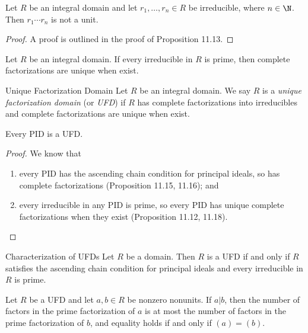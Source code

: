 \documentclass[pmath347]{subfiles}
\begin{document}
    \begin{prop}{}
        Let $R$ be an integral domain and let $r_1,\ldots,r_n\in R$ be irreducible, where $n\in\N$. Then $r_1\cdots r_n$ is not a unit.
    \end{prop}

    \begin{proof}
        A proof is outlined in the proof of Proposition 11.13.
    \end{proof}
    
    \begin{prop}{}
        Let $R$ be an integral domain. If every irreducible in $R$ is prime, then complete factorizations are unique when exist.
    \end{prop}

    \begin{definition}{Unique Factorization Domain}{}
        Let $R$ be an integral domain. We say $R$ is a \emph{unique factorization domain} (or \emph{UFD}) if $R$ has complete factorizations into irreducibles and complete factorizations are unique when exist.
    \end{definition}

    \begin{prop}{}
        Every PID is a UFD.
    \end{prop}

    \begin{proof}
        We know that
        \begin{enumerate}
            \item every PID has the ascending chain condition for principal ideals, so has complete factorizations (Proposition 11.15, 11.16); and
            \item every irreducible in any PID is prime, so every PID has unique complete factorizations when they exist (Proposition 11.12, 11.18). \qqedsym
        \end{enumerate}
    \end{proof}

    \begin{theorem}{Characterization of UFDs}
        Let $R$ be a domain. Then $R$ is a UFD if and only if $R$ satisfies the ascending chain condition for principal ideals and every irreducible in $R$ is prime.
    \end{theorem}

    \begin{lemma_inside}{}
        Let $R$ be a UFD and let $a,b\in R$ be nonzero nonunits. If $a|b$, then the number of factors in the prime factorization of $a$ is at most the number of factors in the prime factorization of $b$, and equality holds if and only if $\left( a \right) = \left( b \right)$.
    \end{lemma_inside}
\end{document}
